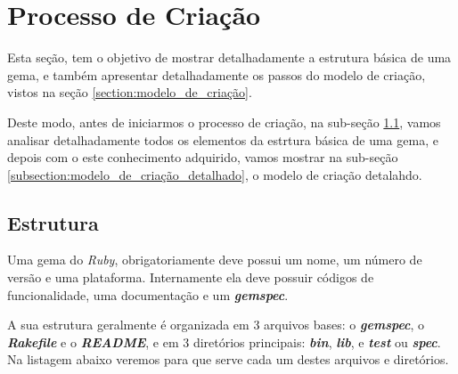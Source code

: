\section{Processo de Criação}
\label{section:processo_de_criação}


Esta seção, tem o objetivo de mostrar detalhadamente a estrutura básica de uma gema, e também apresentar
detalhadamente os passos do modelo de criação, vistos na seção \ref{section:modelo_de_criação}.

Deste modo, antes de iniciarmos o processo de criação, na sub-seção \ref{subsection:estrutura}, vamos analisar
detalhadamente todos os elementos da estrtura básica de uma gema, e depois com o este conhecimento
adquirido, vamos mostrar na sub-seção \ref{subsection:modelo_de_criação_detalhado}, o modelo de criação detalahdo.


\subsection{Estrutura}
\label{subsection:estrutura}


Uma gema do \emph{Ruby}, obrigatoriamente deve possui um nome, um número de versão e uma plataforma.
Internamente ela deve possuir códigos de funcionalidade, uma documentação e um \emph{\textbf{gemspec}}.

A sua estrutura geralmente é organizada em 3 arquivos bases: o \emph{\textbf{gemspec}}, o
\emph{\textbf{Rakefile}} e o \emph{\textbf{README}}, e em 3 diretórios principais: \emph{\textbf{bin}},
\emph{\textbf{lib}}, e \emph{\textbf{test}} ou \emph{\textbf{spec}}. Na listagem abaixo veremos para que
serve cada um destes arquivos e diretórios.

